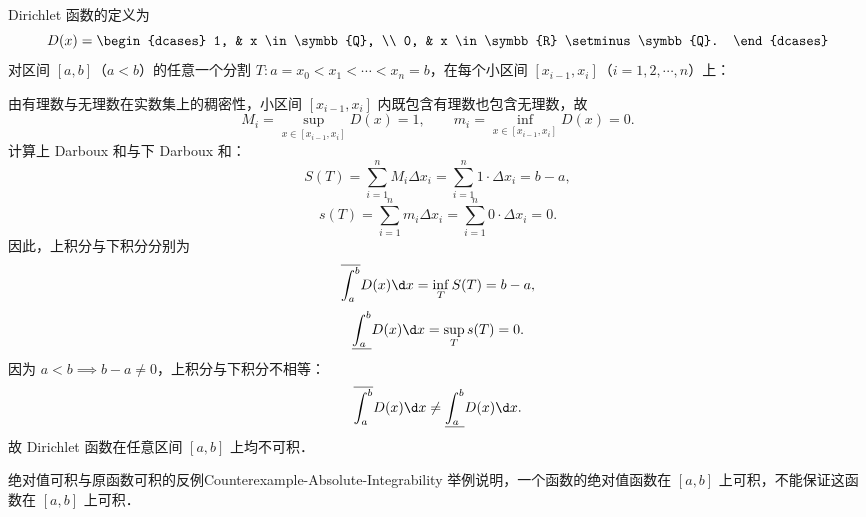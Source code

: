\begin{myproof}
    Dirichlet 函数的定义为
    \begin{equation}
        D(x) = \begin{dcases} 1, & x \in \symbb{Q}, \\ 0, & x \in \symbb{R} \setminus \symbb{Q}. \end{dcases}
    \end{equation}
    对区间 $[a, b]$（$a < b$）的任意一个分割 $T : a = x_0 < x_1 < \cdots < x_n = b$，在每个小区间 $[x_{i-1}, x_i]$（$i = 1, 2, \cdots, n$）上：

    由有理数与无理数在实数集上的稠密性，小区间 $[x_{i-1}, x_i]$ 内既包含有理数也包含无理数，故
    \begin{equation}
        M_i = \sup_{x\in [x_{i-1}, x_i]} D(x) = 1, \qquad m_i = \inf_{x\in [x_{i-1}, x_i]} D(x) = 0.
    \end{equation}
    计算上 Darboux 和与下 Darboux 和：
    \begin{equation}
        S(T) = \sum_{i=1}^n M_i \Delta x_i = \sum_{i=1}^n 1 \cdot \Delta x_i = b - a,
    \end{equation}
    \begin{equation}
        s(T) = \sum_{i=1}^n m_i \Delta x_i = \sum_{i=1}^n 0 \cdot \Delta x_i = 0.
    \end{equation}
    因此，上积分与下积分分别为
    \begin{equation}
        \overline{\int_a^b} D(x) \d x = \inf_T S(T) = b - a,
    \end{equation}
    \begin{equation}
        \underline{\int_a^b} D(x) \d x = \sup_T s(T) = 0.
    \end{equation}
    因为 $a < b \implies b - a \neq 0$，上积分与下积分不相等：
    \begin{equation}
        \overline{\int_a^b} D(x) \d x \neq \underline{\int_a^b} D(x) \d x.
    \end{equation}
    故 Dirichlet 函数在任意区间 $[a, b]$ 上均不可积．
\end{myproof}

\begin{problem}{绝对值可积与原函数可积的反例}{Counterexample-Absolute-Integrability}
    举例说明，一个函数的绝对值函数在 $[a, b]$ 上可积，不能保证这函数在 $[a, b]$ 上可积．
\end{problem}

